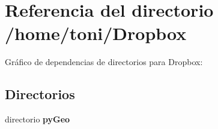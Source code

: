 \section{Referencia del directorio /home/toni/\-Dropbox}
\label{dir_2fbdf3383b04fb3f9e3947996901697e}
Gráfico de dependencias de directorios para Dropbox\-:
\subsection*{Directorios}
\begin{DoxyCompactItemize}
\item 
directorio {\bf py\-Geo}
\end{DoxyCompactItemize}

